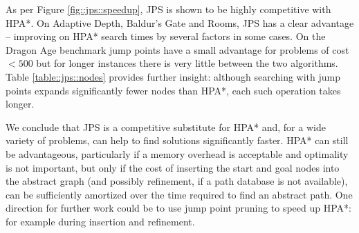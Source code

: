 As per Figure \ref{fig::jps::speedup}, JPS is shown to be highly competitive
with HPA{*}.  On Adaptive Depth, Baldur's Gate and Rooms, JPS has a clear
advantage -- improving on HPA{*} search times by several factors in some cases.
On the Dragon Age benchmark jump points have a small advantage for problems of
cost $< 500$ but for longer instances there is very little between the two
algorithms.  Table \ref{table::jps::nodes} provides further insight: although
searching with jump points expands significantly fewer nodes than HPA{*}, each
such operation takes longer.

We conclude that JPS is a competitive substitute for HPA{*} and, for a wide
variety of problems, can help to find solutions significantly faster.  HPA{*}
can still be advantageous, particularly if a memory overhead is acceptable and
optimality is not important, but only if the cost of inserting the start and
goal nodes into the abstract graph (and possibly refinement, if a path
database is not available), can be sufficiently amortized over the time
required to find an abstract path.  One direction for further work could be to
use jump point pruning to speed up HPA{*}: for example during insertion and
refinement.

